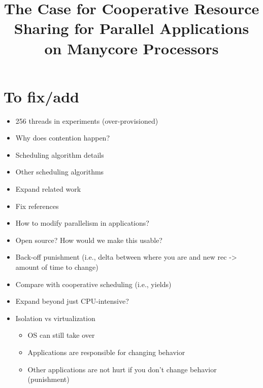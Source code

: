 \documentclass[10pt]{sigplanconf}
\begin{document}
\title{The Case for Cooperative Resource Sharing for Parallel Applications on Manycore Processors}
\maketitle

\section*{To fix/add}
\begin{itemize}
    \item 256 threads in experiments (over-provisioned)
    \item Why does contention happen?
    \item Scheduling algorithm details
    \item Other scheduling algorithms
    \item Expand related work
    \item Fix references
    \item How to modify parallelism in applications?
    \item Open source? How would we make this usable?
    \item Back-off punishment (i.e., delta between where you are and new rec -> amount of time to change)
    \item Compare with cooperative scheduling (i.e., yields)
    \item Expand beyond just CPU-intensive?
    \item Isolation vs virtualization
    \begin{itemize}
      \item OS can still take over
      \item Applications are responsible for changing behavior
      \item Other applications are not hurt if you don't change behavior (punishment)
    \end{itemize}
\end{itemize}



% 









\end{document}
